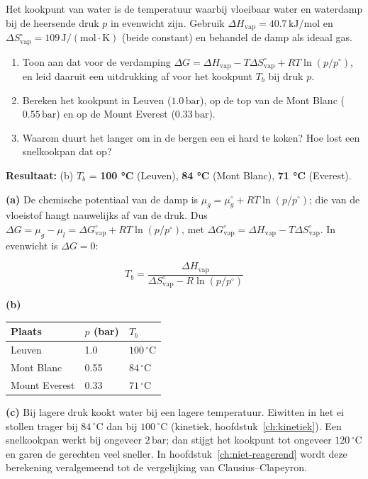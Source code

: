 \begin{oefening}
Het kookpunt van water is de temperatuur waarbij vloeibaar water en waterdamp bij de heersende druk \(p\) in evenwicht zijn. Gebruik \(\Delta H_{\text{vap}} = 40.7\,\mathrm{kJ/mol}\) en \(\Delta S^\circ_{\text{vap}} = 109\,\mathrm{J/(mol\cdot K)}\) (beide constant) en behandel de damp als ideaal gas.

\begin{enumerate}
\item[(a)]
  Toon aan dat voor de verdamping \(\Delta G = \Delta H_{\text{vap}} - T\Delta S^\circ_{\text{vap}} + RT\ln(p/p^\circ)\), en leid daaruit een uitdrukking af voor het kookpunt \(T_b\) bij druk \(p\).
\item[(b)]
  Bereken het kookpunt in Leuven (\(1.0\,\mathrm{bar}\)), op de top van de Mont Blanc (\(0.55\,\mathrm{bar}\)) en op de Mount Everest (\(0.33\,\mathrm{bar}\)).
\item[(c)]
  Waarom duurt het langer om in de bergen een ei hard te koken? Hoe lost een snelkookpan dat op?
\end{enumerate}
\end{oefening}
\begin{oplossing}
\textbf{Resultaat:} (b) \(T_b\) = \textbf{100 °C} (Leuven), \textbf{84 °C} (Mont Blanc), \textbf{71 °C} (Everest).

\textbf{(a)} De chemische potentiaal van de damp is \(\mu_g = \mu_g^\circ + RT\ln(p/p^\circ)\); die van de vloeistof hangt nauwelijks af van de druk. Dus \(\Delta G = \mu_g - \mu_l = \Delta G^\circ_{\text{vap}} + RT\ln(p/p^\circ)\), met \(\Delta G^\circ_{\text{vap}} = \Delta H_{\text{vap}} - T\Delta S^\circ_{\text{vap}}\). In evenwicht is \(\Delta G = 0\):

\[
T_b = \frac{\Delta H_{\text{vap}}}{\Delta S^\circ_{\text{vap}} - R\ln(p/p^\circ)}
\]

\textbf{(b)}

\begin{center}
\begin{tabular}{lll}
\toprule
Plaats & \(p\) (bar) & \(T_b\) \\
\midrule
Leuven & 1.0 & \(100\,^\circ\mathrm{C}\) \\
Mont Blanc & 0.55 & \(84\,^\circ\mathrm{C}\) \\
Mount Everest & 0.33 & \(71\,^\circ\mathrm{C}\) \\
\bottomrule
\end{tabular}
\end{center}

\textbf{(c)} Bij lagere druk kookt water bij een lagere temperatuur. Eiwitten in het ei stollen trager bij \(84\,^\circ\mathrm{C}\) dan bij \(100\,^\circ\mathrm{C}\) (kinetiek, hoofdstuk~\ref{ch:kinetiek}). Een snelkookpan werkt bij ongeveer \(2\,\mathrm{bar}\); dan stijgt het kookpunt tot ongeveer \(120\,^\circ\mathrm{C}\) en garen de gerechten veel sneller. In hoofdstuk~\ref{ch:niet-reagerend} wordt deze berekening veralgemeend tot de vergelijking van Clausius--Clapeyron.
\end{oplossing}


